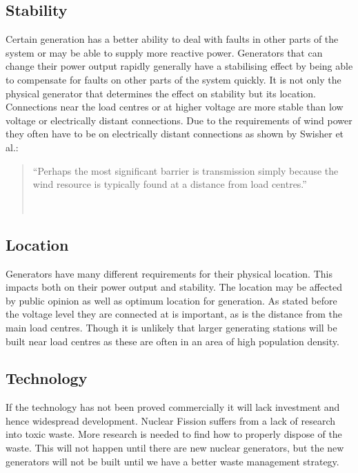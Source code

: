 \documentclass[a4paper,oneside,12pt]{report}
\newcommand{\tmpquotecite}{}%
\newenvironment{myquote}[1][]
{\renewcommand{\tmpquotecite}{#1}\begin{quote}\begin{itshape}``}
{''\end{itshape}~{\normalfont~\tmpquotecite}\end{quote}}
\begin{document}
\subsection{Stability}

Certain generation has a better ability to deal with faults in other parts of the system or may be able to supply more reactive power. Generators that can change their power output rapidly generally have a stabilising effect by being able to compensate for faults on other parts of the system quickly. It is not only the physical generator that determines the effect on stability but its location. Connections near the load centres or at higher voltage are more stable than low voltage or electrically distant connections. Due to the requirements of wind power they often have to be on electrically distant connections as shown by Swisher et al.:

\begin{myquote}[\cite{SwisherDec2001}]Perhaps the most significant barrier is transmission simply because the wind resource is typically found at a distance from load centres.\end{myquote}

\subsection{Location}

Generators have many different requirements for their physical location. This impacts both on their power output and stability. The location may be affected by public opinion as well as optimum location for generation. As stated before the voltage level they are connected at is important, as is the distance from the main load centres. Though it is unlikely that larger generating stations will be built near load centres as these are often in an area of high population density.

\subsection{Technology}

If the technology has not been proved commercially it will lack investment and hence widespread development. Nuclear Fission suffers from a lack of research into toxic waste. More research is needed to find how to properly dispose of the waste. This will not happen until there are new nuclear generators, but the new generators will not be built until we have a better waste management strategy.
\end{document}
